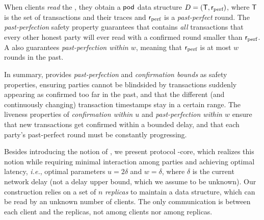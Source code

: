 When clients \emph{read} the \podtm, they obtain a $\textsf{pod}$ data structure $D = (\textsf{T}, \textsf{r}_\text{perf})$, where $\textsf{T}$ is the set of transactions and their traces and $\textsf{r}_\text{perf}$ is a \emph{past-perfect} round. The \emph{past-perfection} safety property guarantees that
\txSet contains \emph{all} transactions that every other honest party will ever read with a confirmed round smaller than $\textsf{r}_\text{perf}$.  A \podtm also guarantees \emph{past-perfection within $w$}, meaning that $\textsf{r}_\text{perf}$ is at most $w$ rounds in the past.


In summary, \podtm provides \emph{past-perfection} and \emph{confirmation bounds} as safety properties, ensuring parties cannot be blindsided by transactions suddenly appearing as confirmed too far in the past, and that the different (and continuously changing) transaction timestamps stay in a certain range. The liveness properties of \emph{confirmation within $u$} and \emph{past-perfection within $w$} ensure that new transactions get confirmed within a bounded delay, and that each party's past-perfect round must be constantly progressing.

Besides introducing the notion of \podtm, we present protocol \podtm-core, which realizes this notion while requiring minimal interaction among parties and achieving optimal latency, \textit{i.e.}, optimal parameters $u=2\delta$ and $w=\delta$, where $\delta$ is the current network delay (not a delay upper bound, which we assume to be unknown). Our construction relies on a set of $n$ \emph{replicas} to maintain a \podtm data structure, which can be read by an unknown number of clients. The only communication is between each client and the replicas, not among clients nor among replicas.

